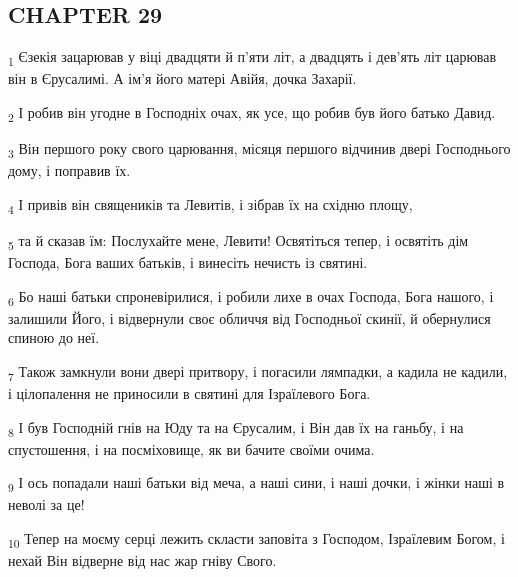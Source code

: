\subsection{CHAPTER 29}
\begin{tcolorbox}
\textsubscript{1} Єзекія зацарював у віці двадцяти й п'яти літ, а двадцять і дев'ять літ царював він в Єрусалимі. А ім'я його матері Авійя, дочка Захарії.
\end{tcolorbox}
\begin{tcolorbox}
\textsubscript{2} І робив він угодне в Господніх очах, як усе, що робив був його батько Давид.
\end{tcolorbox}
\begin{tcolorbox}
\textsubscript{3} Він першого року свого царювання, місяця першого відчинив двері Господнього дому, і поправив їх.
\end{tcolorbox}
\begin{tcolorbox}
\textsubscript{4} І привів він священиків та Левитів, і зібрав їх на східню площу,
\end{tcolorbox}
\begin{tcolorbox}
\textsubscript{5} та й сказав їм: Послухайте мене, Левити! Освятіться тепер, і освятіть дім Господа, Бога ваших батьків, і винесіть нечисть із святині.
\end{tcolorbox}
\begin{tcolorbox}
\textsubscript{6} Бо наші батьки спроневірилися, і робили лихе в очах Господа, Бога нашого, і залишили Його, і відвернули своє обличчя від Господньої скинії, й обернулися спиною до неї.
\end{tcolorbox}
\begin{tcolorbox}
\textsubscript{7} Також замкнули вони двері притвору, і погасили лямпадки, а кадила не кадили, і цілопалення не приносили в святині для Ізраїлевого Бога.
\end{tcolorbox}
\begin{tcolorbox}
\textsubscript{8} І був Господній гнів на Юду та на Єрусалим, і Він дав їх на ганьбу, і на спустошення, і на посміховище, як ви бачите своїми очима.
\end{tcolorbox}
\begin{tcolorbox}
\textsubscript{9} І ось попадали наші батьки від меча, а наші сини, і наші дочки, і жінки наші в неволі за це!
\end{tcolorbox}
\begin{tcolorbox}
\textsubscript{10} Тепер на моєму серці лежить скласти заповіта з Господом, Ізраїлевим Богом, і нехай Він відверне від нас жар гніву Свого.
\end{tcolorbox}
